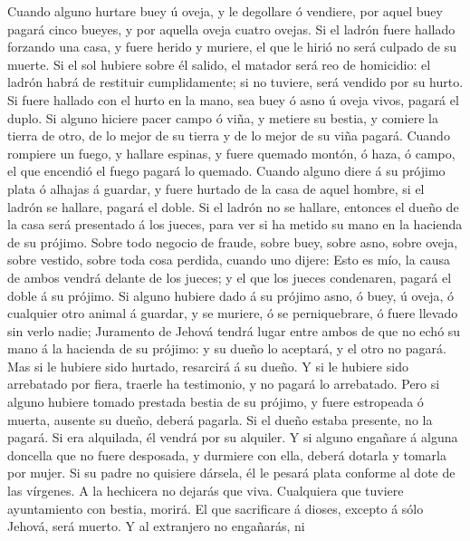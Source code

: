  Cuando alguno hurtare buey ú oveja, y le degollare ó
vendiere, por aquel buey pagará cinco bueyes, y por aquella oveja cuatro
ovejas.  Si el ladrón fuere hallado forzando una casa, y
fuere herido y muriere, el que le hirió no será culpado de su muerte.
 Si el sol hubiere sobre él salido, el matador será reo de
homicidio: el ladrón habrá de restituir cumplidamente; si no tuviere,
será vendido por su hurto.  Si fuere hallado con el hurto en
la mano, sea buey ó asno ú oveja vivos, pagará el duplo.  Si
alguno hiciere pacer campo ó viña, y metiere su bestia, y comiere la
tierra de otro, de lo mejor de su tierra y de lo mejor de su viña
pagará.  Cuando rompiere un fuego, y hallare espinas, y
fuere quemado montón, ó haza, ó campo, el que encendió el fuego pagará
lo quemado.  Cuando alguno diere á su prójimo plata ó
alhajas á guardar, y fuere hurtado de la casa de aquel hombre, si el
ladrón se hallare, pagará el doble.  Si el ladrón no se
hallare, entonces el dueño de la casa será presentado á los jueces, para
ver si ha metido su mano en la hacienda de su prójimo. 
Sobre todo negocio de fraude, sobre buey, sobre asno, sobre oveja, sobre
vestido, sobre toda cosa perdida, cuando uno dijere: Esto es mío, la
causa de ambos vendrá delante de los jueces; y el que los jueces
condenaren, pagará el doble á su prójimo.  Si alguno
hubiere dado á su prójimo asno, ó buey, ú oveja, ó cualquier otro animal
á guardar, y se muriere, ó se perniquebrare, ó fuere llevado sin verlo
nadie;  Juramento de Jehová tendrá lugar entre ambos de que
no echó su mano á la hacienda de su prójimo: y su dueño lo aceptará, y
el otro no pagará.  Mas si le hubiere sido hurtado,
resarcirá á su dueño.  Y si le hubiere sido arrebatado por
fiera, traerle ha testimonio, y no pagará lo arrebatado. 
Pero si alguno hubiere tomado prestada bestia de su prójimo, y fuere
estropeada ó muerta, ausente su dueño, deberá pagarla.  Si
el dueño estaba presente, no la pagará. Si era alquilada, él vendrá por
su alquiler.  Y si alguno engañare á alguna doncella que no
fuere desposada, y durmiere con ella, deberá dotarla y tomarla por
mujer.  Si su padre no quisiere dársela, él le pesará plata
conforme al dote de las vírgenes.  A la hechicera no
dejarás que viva.  Cualquiera que tuviere ayuntamiento con
bestia, morirá.  El que sacrificare á dioses, excepto á
sólo Jehová, será muerto.  Y al extranjero no engañarás, ni
